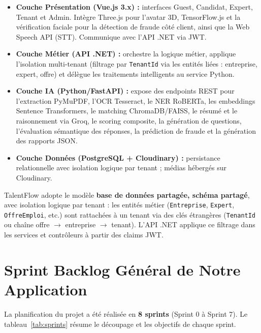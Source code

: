 \begin{itemize}
    \item \textbf{Couche Présentation (Vue.js 3.x) :} interfaces Guest, Candidat, Expert,
    Tenant et Admin. Intègre Three.js pour l'avatar 3D, TensorFlow.js et la vérification
    faciale pour la détection de fraude côté client, ainsi que la Web Speech API (STT).
    Communique avec l'API .NET via JWT.

    \item \textbf{Couche Métier (API .NET) :} orchestre la logique métier, applique
    l'isolation multi-tenant (filtrage par \texttt{TenantId} via les entités liées :
    entreprise, expert, offre) et délègue les traitements intelligents au service Python.

    \item \textbf{Couche IA (Python/FastAPI) :} expose des endpoints REST pour l'extraction
    PyMuPDF, l'OCR Tesseract, le NER RoBERTa, les embeddings Sentence Transformers,
    le matching ChromaDB/FAISS, le résumé et le raisonnement via Groq, le scoring composite,
    la génération de questions, l'évaluation sémantique des réponses, la prédiction de
    fraude et la génération des rapports JSON.

    \item \textbf{Couche Données (PostgreSQL + Cloudinary) :} persistance relationnelle
    avec isolation logique par tenant ; médias hébergés sur Cloudinary.
\end{itemize}

TalentFlow adopte le modèle \textbf{base de données partagée, schéma partagé}, avec
isolation logique par tenant : les entités métier (\texttt{Entreprise}, \texttt{Expert},
\texttt{OffreEmploi}, etc.) sont rattachées à un tenant via des clés étrangères
(\texttt{TenantId} ou chaîne offre $\rightarrow$ entreprise $\rightarrow$ tenant).
L'API .NET applique ce filtrage dans les services et contrôleurs à partir des claims JWT.

\section{Sprint Backlog Général de Notre Application}

La planification du projet a été réalisée en \textbf{8 sprints} (Sprint 0 à Sprint 7).
Le tableau~\ref{tab:sprints} résume le découpage et les objectifs de chaque sprint.

